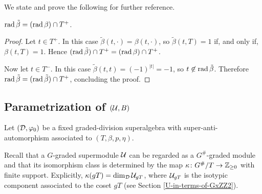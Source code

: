 We state and prove the following for further reference.

\begin{lemma}
    $\operatorname{rad} \tilde\beta = (\operatorname{rad} \beta)\cap T^+$.
\end{lemma}

\begin{proof}
    Let $t\in T^+$. 
    In this case $\tilde\beta (t, \cdot) = \beta (t, \cdot)$, so
    $\tilde\beta (t, T) = 1$ if, and only if, $\beta (t, T) = 1$. 
    Hence $(\operatorname{rad} \tilde\beta)\cap T^+ = (\operatorname{rad} \beta)\cap T^+$. 
    
    Now let $t \in T^-$. 
    In this case $\tilde \beta (t,t) = (-1)^{|t|} = -1$, so $t \not\in \operatorname{rad} \tilde\beta$. 
    Therefore $\operatorname{rad} \tilde\beta = (\operatorname{rad} \tilde\beta)\cap T^+$, concluding the proof.
\end{proof}

\subsection{Parametrization of $(\mathcal U, B)$}


Let $(\mathcal{D}, \varphi_0)$ be a fixed graded-division superalgebra with super-anti-automorphism associated to $(T, \beta, p, \eta)$. 


Recall that a $G$-graded supermodule $\mathcal U$ can be regarded as a $G^\#$-graded module 
and that its isomorphism class is determined by the map $\kappa\colon G^\#/T \to \mathbb{Z}_{\geq 0}$ with finite support. 
Explicitly, $\kappa (gT) = \dim_{\mathcal{D}} \mathcal U_{gT}$, where $\mathcal U_{gT}$ is the isotypic component associated to the coset $gT$ (see Section \ref{U-in-terms-of-GxZZ2}).


